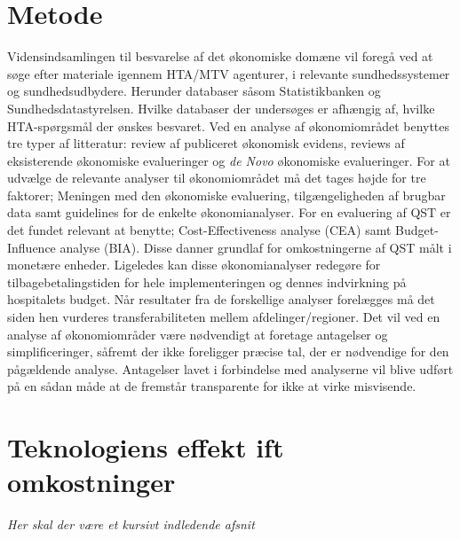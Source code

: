 \section{Metode}
Vidensindsamlingen til besvarelse af det økonomiske domæne vil foregå ved at søge efter materiale igennem HTA/MTV agenturer, i relevante sundhedssystemer og sundhedsudbydere. Herunder databaser såsom Statistikbanken og Sundhedsdatastyrelsen. Hvilke databaser der undersøges er afhængig af, hvilke HTA-spørgsmål der ønskes besvaret. Ved en analyse af økonomiområdet benyttes tre typer af litteratur: review af publiceret økonomisk evidens, reviews af eksisterende økonomiske evalueringer og \textit{de Novo} økonomiske evalueringer. For at udvælge de relevante analyser til økonomiområdet må det tages højde for tre faktorer; Meningen med den økonomiske evaluering, tilgængeligheden af brugbar data samt guidelines for de enkelte økonomianalyser. For en evaluering af QST er det fundet relevant at benytte; Cost-Effectiveness analyse (CEA) samt Budget-Influence analyse (BIA). Disse danner grundlaf for omkostningerne af QST målt i monetære enheder. Ligeledes kan disse økonomianalyser redegøre for tilbagebetalingstiden for hele implementeringen og dennes indvirkning på hospitalets budget. Når resultater fra de forskellige analyser forelægges må det siden hen vurderes transferabiliteten mellem afdelinger/regioner. Det vil ved en analyse af økonomiområder være nødvendigt at foretage antagelser og simplificeringer, såfremt der ikke foreligger præcise tal, der er nødvendige for den pågældende analyse. Antagelser lavet i forbindelse med analyserne vil blive udført på en sådan måde at de fremstår transparente for ikke at virke misvisende. 

\section{Teknologiens effekt ift omkostninger}
\textit{Her skal der være et kursivt indledende afsnit} 

